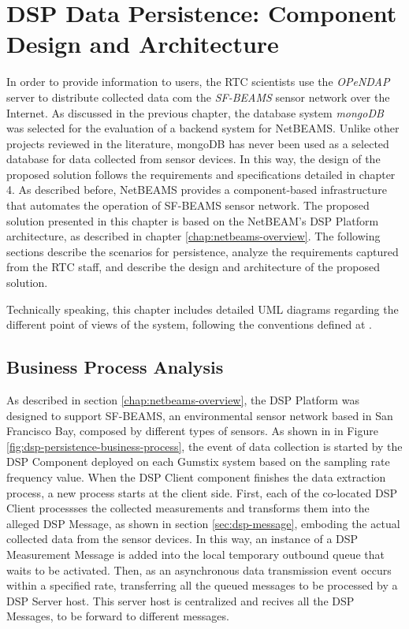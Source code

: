 

\chapter{DSP Data Persistence: Component Design and Architecture}

In order to provide information to users, the RTC scientists use the
\emph{OPeNDAP} \cite{opendap} server to distribute collected data com the
\textit{SF-BEAMS} sensor network over the Internet. As discussed in the previous
chapter, the database system \emph{mongoDB} was selected for the evaluation of a
backend system for NetBEAMS. Unlike other projects reviewed in the literature, mongoDB has
never been used as a selected database for data collected from sensor devices.
In this way, the design of the proposed solution follows the requirements and
specifications detailed in chapter 4. As described before, NetBEAMS provides a
component-based infrastructure that automates the operation of SF-BEAMS sensor
network. The proposed solution presented in this chapter is based on the
NetBEAM's DSP Platform architecture, as described in chapter
\ref{chap:netbeams-overview}. The following sections describe the scenarios for
persistence, analyze the requirements captured from the RTC staff, and describe
the design and architecture of the proposed solution.

Technically speaking, this chapter includes detailed UML diagrams regarding the
different point of views of the system, following the conventions defined at
\cite{uml}.

\section{Business Process Analysis}
\label{sec:business-process-analysis}

As described in section \ref{chap:netbeams-overview}, the DSP Platform was
designed to support SF-BEAMS, an environmental sensor network based in San
Francisco Bay, composed by different types of sensors. As shown in in Figure
\ref{fig:dsp-persistence-business-process}, the event of data collection is
started by the DSP Component deployed on each Gumstix system based on the
sampling rate frequency value. When the DSP Client component finishes the data
extraction process, a new process starts at the client side. First, each of the
co-located DSP Client processses the collected measurements and transforms
them into the alleged DSP Message, as shown in section \ref{sec:dsp-message}, 
emboding the actual collected data from the sensor devices. In this way, an 
instance of a DSP Measurement Message is added into the local temporary
outbound queue that waits to be activated. Then, as an asynchronous data
transmission event occurs within a specified rate, transferring all the queued
messages to be processed by a DSP Server host. This server host is centralized
and recives all the DSP Messages, to be forward to different messages.


